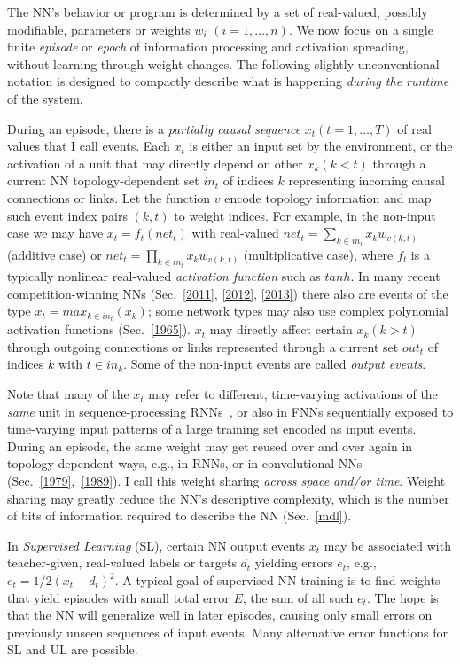 \documentclass[letterpaper]{article}
\begin{document}
\begin{CJK*}{UTF8}{gbsn}
The NN's behavior or program is determined by a set of real-valued, possibly modifiable,
parameters or weights 
$w_i$ $(i=1,\ldots,n)$.
We now focus on a single finite {\em episode} or {\em epoch} of information processing 
and activation spreading, without learning through weight changes.
The following slightly unconventional 
notation is designed to compactly describe what is happening
 {\em during the runtime} of the system. 


During an episode, 
there is a {\em partially causal sequence}  
$x_t (t=1,\ldots,T)$ of real values that I call events.
Each $x_t$ is either an input set by the environment, 
or the activation of a unit 
that may directly depend on other $x_k (k<t)$ through a current 
NN topology-dependent 
set $in_t$ of indices $k$ representing incoming causal connections or links.
Let the function $v$ encode topology information and map such event index pairs $(k,t)$ to weight indices.
For example, in the non-input case we may have 
$x_t=f_t(net_t)$ 
with real-valued 
$net_t=\sum_{k \in in_t} x_k w_{v(k,t)}$ (additive case)
or $net_t=\prod_{k \in in_t} x_k w_{v(k,t)}$ (multiplicative case),
where $f_t$ is a typically nonlinear real-valued {\em activation function}
such as $tanh$.
In many recent competition-winning NNs 
(Sec.~\ref{2011}, \ref{2012}, \ref{2013})
there also are  events of the type $x_t=max_{k \in in_t}(x_k)$;
some network types may also use complex polynomial activation functions (Sec.~\ref{1965}).
$x_t$ may directly affect certain  $x_k (k>t)$ through outgoing connections or links 
represented through a current 
set $out_t$ of indices $k$ with $t \in in_k$.
Some of the non-input events are called {\em output events}.

Note that many of the $x_t$ may refer to different, time-varying activations of the {\em same} unit
in sequence-processing RNNs~\citep[e.g.,][{\em ``unfolding in time"}]{Williams:89},
or also in FNNs sequentially exposed to time-varying input patterns of a large training set 
encoded as input events.
During an episode, the same weight may get reused over and over again
in topology-dependent ways, e.g., in RNNs, or in convolutional NNs
(Sec.~\ref{1979},~\ref{1989}).
I call this weight sharing {\em across space and/or time}.
Weight sharing may greatly reduce the NN's descriptive complexity, which is the number of bits of information 
required to describe the NN (Sec.~\ref{mdl}). 


In {\em Supervised Learning} (SL), 
certain NN output events $x_t$  may be associated with teacher-given, real-valued labels or targets $d_t$ 
yielding errors $e_t$, e.g., $e_t=1/2(x_t-d_t)^2$.
A typical goal of supervised NN training is to find weights that 
yield episodes with small total error $E$, 
the sum of all such $e_t$. 
The hope is that the NN will generalize well in later episodes,
causing only small errors on previously unseen sequences of input events. 
Many alternative error functions for SL and UL are possible.


\end{CJK*}
\end{document}
